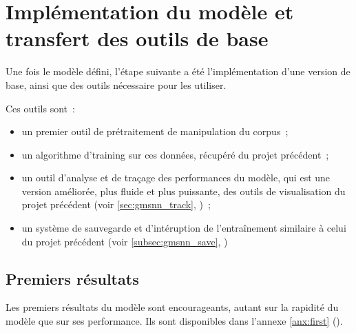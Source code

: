 \section{Implémentation du modèle et transfert des outils de base}
Une fois le modèle défini, l'étape suivante a été l'implémentation d'une version de base, ainsi que des outils nécessaire pour les utiliser.

Ces outils sont~:
\begin{itemize}
	\item un premier outil de prétraitement de manipulation du \gls{corpus}~;
	\item un algorithme d'\gls{training} sur ces données, récupéré du projet précédent~;
	\item un outil d'analyse et de traçage des performances du modèle, qui est une version améliorée, plus fluide et plus puissante, des outils de visualisation du projet précédent (voir \autoref{sec:gmsnn_track}, )~;
	\item un système de sauvegarde et d'intéruption de l'entraînement similaire à celui du projet précédent (voir \autoref{subsec:gmsnn_save}, )
\end{itemize}

\subsection{Premiers résultats}
Les premiers résultats du modèle sont encourageants, autant sur la rapidité du modèle que sur ses performance.
Ils sont disponibles dans l'annexe \ref{anx:first} ().
